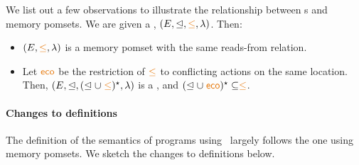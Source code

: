 We list out a few observations to illustrate the relationship between \tvalpom s and memory pomsets.  We are given a  \tvalpom, 
  $(\Event, {\sle}, {\gtN}, \labeling)$.  Then:
\begin{itemize}
\item $(\Event, {\gtN},\labeling)$ is a memory pomset with the same reads-from relation.  

\item Let $\reco$ be the restriction of $\gtN$ to conflicting actions on the same location.  Then, $(\Event, {\sle}, (\sle \cup \gtN)^{\star}, \labeling)$ is a \tvalpom, and $(\sle \cup \reco)^{\star} \subseteq \gtN$.
\end{itemize}

\paragraph*{Changes to definitions}
The definition of the semantics of programs using \tvalpom\ largely follows the one using memory pomsets.  We sketch the changes to definitions below.

